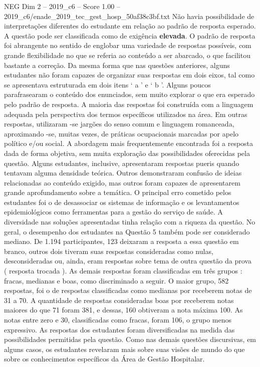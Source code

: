 \begin{textsample}{NEG Dim 2 – 2019\_c6 – Score 1.00 – 2019\_c6/enade\_2019\_tec\_gest\_hosp\_50af38c3bf.txt}
Não havia possibilidade de interpretações diferentes do estudante em relação ao padrão de resposta esperado.
A questão pode ser classificada como de exigência \textbf{elevada}.
O padrão de resposta foi abrangente no sentido de englobar uma variedade de respostas possíveis, com grande flexibilidade no que se referia ao conteúdo a ser abarcado, o que facilitou bastante a correção.
Da mesma forma que nas questões anteriores, alguns estudantes não foram capazes de organizar suas respostas em dois eixos, tal como se apresentava estruturada em dois itens ‘ a ’ e ‘ b ’.
Alguns poucos parafrasearam o conteúdo dos enunciados, sem muito explorar o que era esperado pelo padrão de resposta.
A maioria das respostas foi construída com a linguagem adequada pela perspectiva dos termos específicos utilizados na área.
Em outras respostas, utilizaram -se jargões do senso comum e linguagem romanceada, aproximando -se, muitas vezes, de práticas ocupacionais marcadas por apelo político e/ou social.
A abordagem mais frequentemente encontrada foi a resposta dada de forma objetiva, sem muita exploração das possibilidades oferecidas pela questão.
Alguns estudantes, inclusive, apresentaram respostas pueris quando tentavam alguma densidade teórica.
Outros demonstraram confusão de ideias relacionadas ao conteúdo exigido, mas outros foram capazes de apresentarem grande aprofundamento sobre a temática.
O principal erro cometido pelos estudantes foi o de desassociar os sistemas de informação e os levantamentos epidemiológicos como ferramentas para a gestão do serviço de saúde.
A diversidade nas soluções apresentadas tinha relação com a riqueza da questão.
No geral, o desempenho dos estudantes na Questão 5 também pode ser considerado mediano.
De 1.194 participantes, 123 deixaram a resposta a essa questão em branco, outros dois tiveram suas respostas consideradas como nulas, desconsideradas ou, ainda, eram respostas sobre tema de outra questão da prova ( resposta trocada ).
As demais respostas foram classificadas em três grupos : fracas, medianas e boas, como discriminado a seguir.
O maior grupo, 582 respostas, foi o de respostas classificadas como medianas por receberem notas de 31 a 70.
A quantidade de respostas consideradas boas por receberem notas maiores do que 71 foram 381, e dessas, 160 obtiveram a nota máxima 100.
As notas entre zero e 30, classificadas como fracas, foram 106, o grupo menos expressivo.
As respostas dos estudantes foram diversificadas na medida das possibilidades permitidas pela questão.
Como nas demais questões discursivas, em alguns casos, os estudantes revelaram mais sobre suas visões de mundo do que sobre os conhecimentos específicos da Área de Gestão Hospitalar.

\end{textsample}
